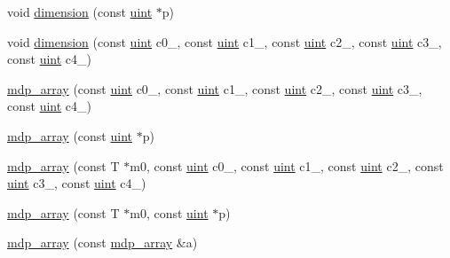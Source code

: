 \begin{DoxyCompactItemize}
\item 
void \hyperlink{classmdp__array_a6a3d01021b01c27ea0a0cf43dd442ad5}{dimension} (const \hyperlink{mdp__global__vars_8h_a91ad9478d81a7aaf2593e8d9c3d06a14}{uint} $\ast$p)
\item 
void \hyperlink{classmdp__array_a816b392dd8ab232c18818e6f186127aa}{dimension} (const \hyperlink{mdp__global__vars_8h_a91ad9478d81a7aaf2593e8d9c3d06a14}{uint} c0\_, const \hyperlink{mdp__global__vars_8h_a91ad9478d81a7aaf2593e8d9c3d06a14}{uint} c1\_, const \hyperlink{mdp__global__vars_8h_a91ad9478d81a7aaf2593e8d9c3d06a14}{uint} c2\_, const \hyperlink{mdp__global__vars_8h_a91ad9478d81a7aaf2593e8d9c3d06a14}{uint} c3\_, const \hyperlink{mdp__global__vars_8h_a91ad9478d81a7aaf2593e8d9c3d06a14}{uint} c4\_)
\item 
\hyperlink{classmdp__array_a231c442576ed1a88e333fb88bcedef41}{mdp\_\-array} (const \hyperlink{mdp__global__vars_8h_a91ad9478d81a7aaf2593e8d9c3d06a14}{uint} c0\_, const \hyperlink{mdp__global__vars_8h_a91ad9478d81a7aaf2593e8d9c3d06a14}{uint} c1\_, const \hyperlink{mdp__global__vars_8h_a91ad9478d81a7aaf2593e8d9c3d06a14}{uint} c2\_, const \hyperlink{mdp__global__vars_8h_a91ad9478d81a7aaf2593e8d9c3d06a14}{uint} c3\_, const \hyperlink{mdp__global__vars_8h_a91ad9478d81a7aaf2593e8d9c3d06a14}{uint} c4\_)
\item 
\hyperlink{classmdp__array_a7bdd0c532c8517bf46bceab7c48f3186}{mdp\_\-array} (const \hyperlink{mdp__global__vars_8h_a91ad9478d81a7aaf2593e8d9c3d06a14}{uint} $\ast$p)
\item 
\hyperlink{classmdp__array_abf3b0ca804544eac3be7d8e499eeb089}{mdp\_\-array} (const T $\ast$m0, const \hyperlink{mdp__global__vars_8h_a91ad9478d81a7aaf2593e8d9c3d06a14}{uint} c0\_, const \hyperlink{mdp__global__vars_8h_a91ad9478d81a7aaf2593e8d9c3d06a14}{uint} c1\_, const \hyperlink{mdp__global__vars_8h_a91ad9478d81a7aaf2593e8d9c3d06a14}{uint} c2\_, const \hyperlink{mdp__global__vars_8h_a91ad9478d81a7aaf2593e8d9c3d06a14}{uint} c3\_, const \hyperlink{mdp__global__vars_8h_a91ad9478d81a7aaf2593e8d9c3d06a14}{uint} c4\_)
\item 
\hyperlink{classmdp__array_a1932c8ea14f2fc8cb7343f9834154521}{mdp\_\-array} (const T $\ast$m0, const \hyperlink{mdp__global__vars_8h_a91ad9478d81a7aaf2593e8d9c3d06a14}{uint} $\ast$p)
\item 
\hyperlink{classmdp__array_af266114d51b7b0e038cb555ba02d83d4}{mdp\_\-array} (const \hyperlink{classmdp__array}{mdp\_\-array} \&a)
\item 

\end{DoxyCompactItemize}

